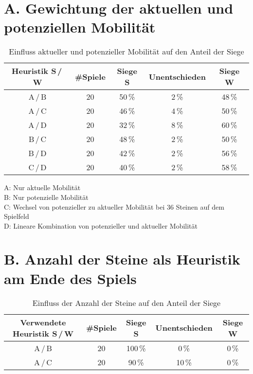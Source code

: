 
\addchap{\langanhang}

\section*{A. Gewichtung der aktuellen und potenziellen Mobilität}
 
\setcounter{table}{0}
\renewcommand{\thetable}{A\arabic{table}}

\begin{table}[hb]
\centering
\begin{tabular}{c|c|ccc}
\hline
Heuristik S\,/\,W & \#Spiele & Siege S & Unentschieden & Siege W \\
\hline
 A\,/\,B & 20 & 50\,\% &  2\,\% & 48\,\% \\
 A\,/\,C & 20 & 46\,\% &  4\,\% & 50\,\% \\
 A\,/\,D & 20 & 32\,\% &  8\,\% & 60\,\% \\
 B\,/\,C & 20 & 48\,\% &  2\,\% & 50\,\% \\
 B\,/\,D & 20 & 42\,\% &  2\,\% & 56\,\% \\
 C\,/\,D & 20 & 40\,\% &  2\,\% & 58\,\% \\
\hline
\end{tabular}
\caption{Einfluss aktueller und potenzieller Mobilität auf den Anteil der Siege}
\label{table:mobility}
\end{table}

\small{
A: Nur aktuelle Mobilität \\
B: Nur potenzielle Mobilität \\
C: Wechsel von potenzieller zu aktueller Mobilität bei 36 Steinen auf dem Spielfeld \\
D: Lineare Kombination von potenzieller und aktueller Mobilität}

\pagebreak

\section*{B. Anzahl der Steine als Heuristik am Ende des Spiels}
 
\setcounter{table}{0}
\renewcommand{\thetable}{B\arabic{table}}

\begin{table}[hb]
\centering
\begin{tabular}{c|c|ccc}
\hline
Verwendete Heuristik S\,/\,W & \#Spiele & Siege S & Unentschieden & Siege W \\
\hline
 A\,/\,B & 20 &100\,\% &  0\,\% &  0\,\% \\
 A\,/\,C & 20 & 90\,\% & 10\,\% &  0\,\% \\
\hline
\end{tabular}
\caption{Einfluss der Anzahl der Steine auf den Anteil der Siege}
\label{table:disccount}
\end{table}

